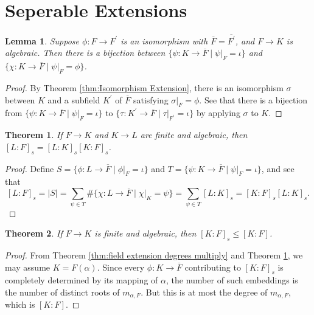 \documentclass[
    parskip=half,
    toc=flat,
    toc=sectionentrydotfill,
]{scrartcl}  %
\theoremstyle{definition}
\theoremstyle{plain}
\newtheorem{theorem}{Theorem}[section]
\newtheorem{lemma}{Lemma}[section]
\theoremstyle{remark}
\begin{document}
\section{Seperable Extensions}

\begin{lemma}
    Suppose $\phi:F\to F^\prime$ is an isomorphism with $\overline{F}=\overline{F^\prime}$, and $F\to K$ is algebraic.
    Then there is a bijection between $\{\psi:K\to\overline{F}\mid\psi\vert_F=\iota\}$ and
    $\{\chi:K\to\overline{F}\mid\psi\vert_F=\phi\}$.
\end{lemma}

\begin{proof}
    By Theorem \ref{thm:Isomorphism Extension}, there is an isomorphism $\sigma$ between $K$ and a subfield $K^\prime$
    of $\overline{F}$ satisfying $\sigma\vert_F=\phi$.
    See that there is a bijection from $\{\psi:K\to\overline{F}\mid\psi\vert_F=\iota\}$ to
    $\{\tau:K^\prime\to\overline{F}\mid\tau\vert_{F^\prime}=\iota\}$ by applying $\sigma$ to $K$.
\end{proof}

\begin{theorem}
    \label{thm:field extension separable degrees multiply}
    If $F\to K$ and $K\to L$ are finite and algebraic, then $[L:F]_s=[L:K]_s[K:F]_s$.
\end{theorem}

\begin{proof}
    Define $S=\{\phi:L\to\overline{F}\mid\phi\vert_F=\iota\}$ and $T=\{\psi:K\to\overline{F}\mid\psi\vert_F=\iota\}$,
    and see that
    \[[L:F]_s=\lvert S\rvert=\sum_{\psi\in T}\#\{\chi:L\to\overline{F}\mid\chi\vert_K=\psi\}=\sum_{\psi\in T}[L:K]_s=[K:F]_s[L:K]_s\text{.}\]
\end{proof}

\begin{theorem}
    \label{thm:separable degree at most degree}
    If $F\to K$ is finite and algebraic, then $[K:F]_s\leq [K:F]$.
\end{theorem}

\begin{proof}
    From Theorem \ref{thm:field extension degrees multiply} and Theorem
    \ref{thm:field extension separable degrees multiply}, we may assume $K=F(\alpha)$.
    Since every $\phi:K\to\overline{F}$ contributing to $[K:F]_s$ is completely determined by its mapping of $\alpha$,
    the number of such embeddings is the number of distinct roots of $m_{\alpha,F}$.
    But this is at most the degree of $m_{\alpha,F}$, which is $[K:F]$.
\end{proof}
\end{document}
